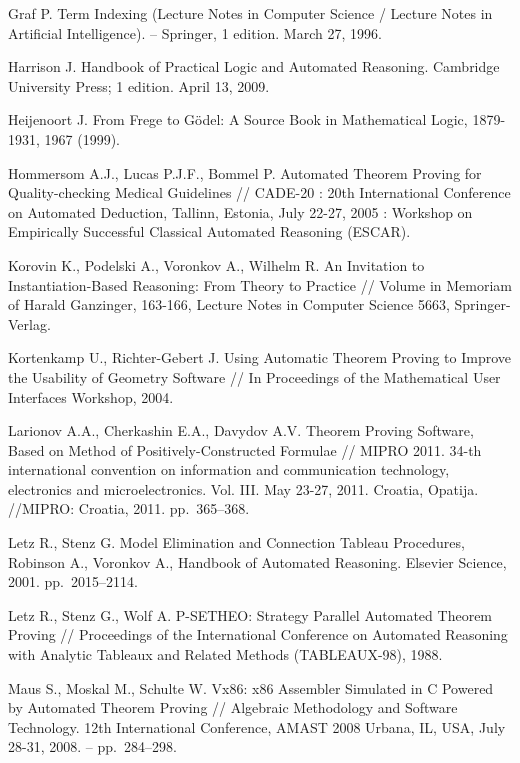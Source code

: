 \begin{thebibliography}{99}
 Graf P. Term Indexing (Lecture Notes in Computer Science / Lecture Notes in Artificial Intelligence). -- Springer, 1 edition. March 27, 1996.

 Harrison J. Handbook of Practical Logic and Automated Reasoning. Cambridge University Press; 1 edition. April 13, 2009.


 Heijenoort J. From Frege to Gödel: A Source Book in Mathematical Logic, 1879-1931, 1967 (1999).

 Hommersom A.J., Lucas P.J.F., Bommel P. Automated Theorem Proving for Quality-checking Medical Guidelines // CADE-20 : 20th International Conference on Automated Deduction, Tallinn, Estonia, July 22-27, 2005 : Workshop on Empirically Successful Classical Automated Reasoning (ESCAR).


 Korovin K., Podelski A., Voronkov A., Wilhelm R. An Invitation to Instantiation-Based Reasoning: From Theory to Practice // Volume in Memoriam of Harald Ganzinger, 163-166, Lecture Notes in Computer Science 5663, Springer-Verlag.

 Kortenkamp U., Richter-Gebert J. Using Automatic Theorem Proving to Improve the Usability of Geometry Software // In Proceedings of the Mathematical User Interfaces Workshop, 2004.


  Larionov A.A., Cherkashin E.A., Davydov A.V. Theorem Proving Software, Based on Method of Positively-Constructed Formulae // MIPRO 2011. 34-th international convention on information and communication technology, electronics and microelectronics. Vol. III. May 23-27, 2011. Croatia, Opatija. //MIPRO: Croatia, 2011. pp.~365--368.

 Letz R., Stenz G. Model Elimination and Connection Tableau Procedures, Robinson A., Voronkov A., Handbook of Automated Reasoning. Elsevier Science, 2001. pp.~2015--2114.

  Letz R., Stenz G., Wolf A. P-SETHEO: Strategy Parallel Automated Theorem Proving // Proceedings of the International Conference on Automated Reasoning with Analytic Tableaux and Related Methods (TABLEAUX-98), 1988.

 Maus S., Moskal M., Schulte W. Vx86: x86 Assembler Simulated in C Powered by Automated Theorem Proving // Algebraic Methodology and Software Technology. 12th International Conference, AMAST 2008 Urbana, IL, USA, July 28-31, 2008.  -- pp.~284--298.


\end{thebibliography}
